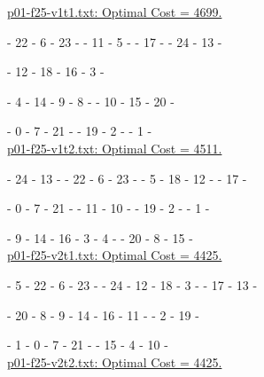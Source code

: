 \underline{p01-f25-v1t1.txt: Optimal Cost = 4699.}
 
\ta - 22 - 6 - 23 - \ta - 11 - 5 - \ta - 17 - \ta - 24 - 13 -  \ta
 
\ta - 12 - 18 - 16 - 3 - \ta

\te - 4 - 14 - 9 - 8 -  \te - 10 - 15 - 20 -  \te

\te - 0 - 7 - 21 - \te - 19 - 2 - \te - 1 -  \te
\\ 

\underline{p01-f25-v1t2.txt: Optimal Cost =  4511.}
 
\ta - 24 - 13 - \ta - 22 - 6 - 23 - \ta - 5 - 18 - 12 - \ta - 17 - \ta

\te - 0 - 7 - 21 - \te - 11 - 10 - \te - 19 - 2 - \te - 1 - \te
  
\te - 9 - 14 - 16 - 3 - 4 - \te - 20 - 8 - 15 - \te
\\ 

\underline{p01-f25-v2t1.txt: Optimal Cost =  4425.}
 
\ta - 5 - 22 - 6 - 23 - \ta - 24 - 12 - 18 - 3 - \ta - 17 - 13 - \ta

\te - 20 - 8 - 9 - 14 - 16 - 11 - \te - 2 - 19 - \te

\te - 1 - 0 - 7 - 21 - \te - 15 - 4 - 10 - \te
\\ 

\underline{p01-f25-v2t2.txt: Optimal Cost =  4425.}
 
